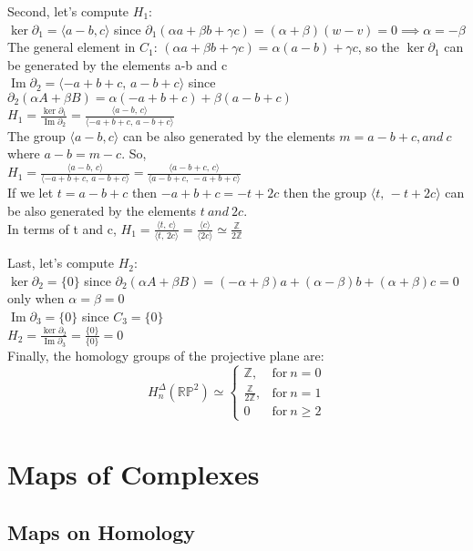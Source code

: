 \documentclass[11pt,a4paper]{report}
\DeclareMathOperator{\Ima}{Im}
\begin{document}
\par
Second, let's compute $H_1$: \\
$\ker\partial_1 = \langle a-b,c \rangle$ 
		since $\partial_1(\alpha a + \beta b + \gamma c) = (\alpha + \beta)(w-v) = 0  \implies \alpha = -\beta$ \\
The general element in $C_1$: $ (\alpha a + \beta b + \gamma c)= \alpha(a-b) + \gamma c $,
so the $\ker\partial_1$ can be generated by the elements a-b and c \\
$\Ima\partial_2 = \langle -a+b+c,\, a-b+c \rangle $ 
		since $\partial_2(\alpha A + \beta B) = \alpha(-a+b+c) + \beta(a-b+c)$ \\
$H_1 = \frac{\ker\partial_1}{\Ima\partial_2} = 
		\frac{ \langle a-b, \,c \rangle  }{ \langle -a+b+c,\, a-b+c \rangle }$\\
The group $\langle a-b, c \rangle$ can be also generated by the elements 
		$ m=a-b+c, and \: c $ where $ a - b = m -c $. So, \\
$H_1 = \frac{ \langle a-b, \,c \rangle  }{ \langle -a+b+c,\, a-b+c \rangle } = \frac{ \langle a-b+c, \, c \rangle  }{ \langle a-b+c,\, -a+b+c \rangle } $ \\
If we let $t=a-b+c$ then $-a+b+c = -t + 2c $ then the group $\langle t,\, -t+2c \rangle$ can be also generated by the elements $ t \: and \: 2c $. \\
In terms of t and c, $H_1 = \frac{ \langle t, \,c \rangle  }{ \langle t,\, 2c \rangle } = \frac{  \langle c \rangle  }{ \langle 2c \rangle } \simeq \frac{\mathbb{Z}}{2\mathbb{Z}}$ \\

\par
Last, let's compute $H_2$: \\
$\ker\partial_2 = \{0\}$ 
		since $\partial_2(\alpha A + \beta B) = (-\alpha+\beta)a +  (\alpha-\beta)b + (\alpha+\beta)c = 0 $ only when $\alpha = \beta = 0$\\
$\Ima\partial_3 = \{0\}$ since $C_3 = \{0\}$ \\ 
$H_2 = \frac{\ker\partial_2}{\Ima\partial_3} = 
		\frac{\{0\} }{\{0\}} = 0 $ \\

Finally, the homology groups of the projective plane are: 
		\[
	  		H_n^\Delta(\mathbb{R} \mathbb{P}^2) \simeq \left\{
			      \begin{array}{rl}
			     \mathbb{Z}, & \textrm{for} \: n = 0\\
			     \frac{\mathbb{Z}}{2\mathbb{Z}}, & \textrm{for} \: n = 1\\
                        0 & \textrm{for} \: n \geqslant 2
			      \end{array}
			 \right.
	  	\]


		
    \section{Maps of Complexes}
    \subsection{Maps on Homology}

		      
		      

 
 
 
 
 
 
 
 
 
 
 
 


 
 
\end{document}
